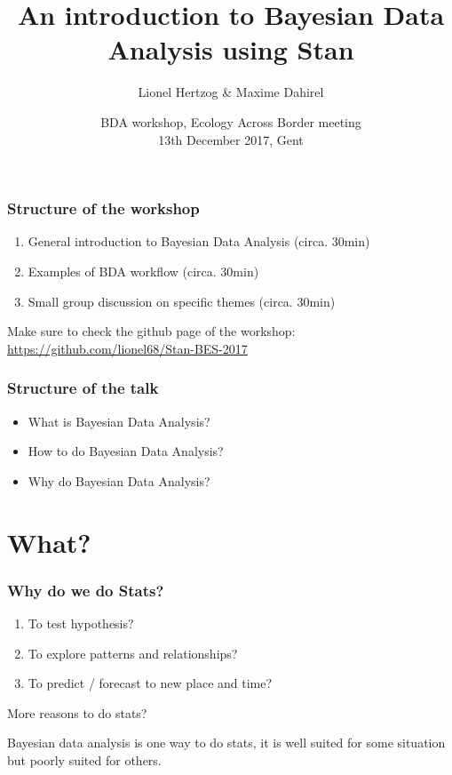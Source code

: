 \documentclass{beamer}
\title{An introduction to Bayesian Data Analysis using Stan}
\subtitle{}
\author{Lionel Hertzog \& Maxime Dahirel}
\date{BDA workshop, Ecology Across Border meeting\\ 13th December 2017, Gent}
\begin{document}
 
 \frame{\titlepage}
 

\begin{frame}
 \frametitle{\bf Structure of the workshop}
  \begin{enumerate}
   \item General introduction to Bayesian Data Analysis (circa. 30min)
   \item Examples of BDA workflow (circa. 30min)
   \item Small group discussion on specific themes (circa. 30min)
  \end{enumerate}
  
  Make sure to check the github page of the workshop: \url{https://github.com/lionel68/Stan-BES-2017}

 
 \end{frame}
 
\begin{frame}
 \frametitle{\bf Structure of the talk}
  \begin{itemize}
   \item What is Bayesian Data Analysis?
   \item How to do Bayesian Data Analysis?
   \item Why do Bayesian Data Analysis?
  \end{itemize}

 
 \end{frame} 
 
 
\section*{What?} 
 
 \begin{frame}
  \frametitle{\bf Why do we do Stats?}

  \begin{enumerate}
   \item To test hypothesis?
   \item To explore patterns and relationships?
   \item To predict / forecast to new place and time?
  \end{enumerate}

  \vspace*{0.5cm}

  More reasons to do stats?
  
  \vspace*{0.2cm}
  
  Bayesian data analysis is one way to do stats, it is well suited for some situation but poorly suited for others.
  
  
  
  
 \end{frame}
\end{document}

